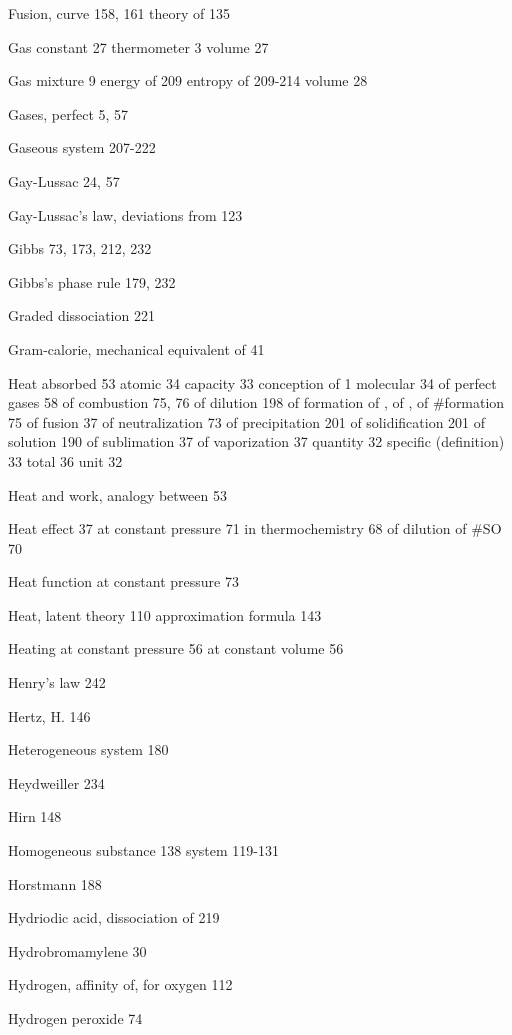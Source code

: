 \documentclass[12pt]{book}[2005/09/16]
\begin{document}
Fusion, curve 158, 161
  theory of 135



Gas
  constant 27
  thermometer 3
  volume 27

Gas mixture 9
  energy of 209
  entropy of 209-214
  volume 28

Gases, perfect 5, 57

Gaseous system 207-222

Gay-Lussac 24, 57

Gay-Lussac's law, deviations from 123

Gibbs 73, 173, 212, 232

Gibbs's phase rule 179, 232

Graded dissociation 221

Gram-calorie, mechanical equivalent of 41



Heat
  absorbed 53
  atomic 34
  capacity 33
  conception of 1
  molecular 34
    of perfect gases 58
  of combustion 75, 76
  of dilution 198
  of formation of , of , of #formation 75
  of fusion 37
  of neutralization 73
  of precipitation 201
  of solidification 201
  of solution 190
  of sublimation 37
  of vaporization 37
  quantity 32
  specific (definition) 33
  total 36
  unit 32

Heat and work, analogy between 53

Heat effect 37
  at constant pressure 71
  in thermochemistry 68
  of dilution of #SO 70

Heat function at constant pressure 73

Heat, latent
  theory 110
  approximation formula 143

Heating
  at constant pressure 56
  at constant volume 56

Henry's law 242

Hertz, H. 146

Heterogeneous system 180

Heydweiller 234

Hirn 148

Homogeneous
  substance 138
  system 119-131

Horstmann 188

Hydriodic acid, dissociation of 219

Hydrobromamylene 30

Hydrogen, affinity of, for oxygen 112

Hydrogen peroxide 74


\end{document}
